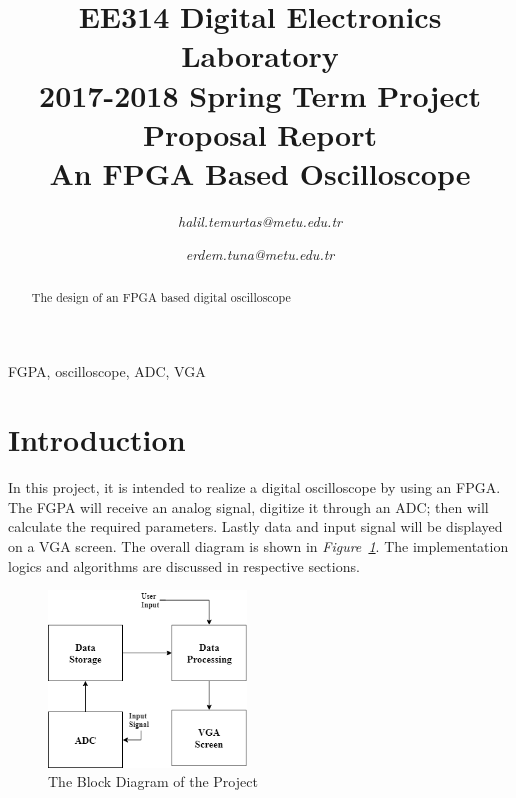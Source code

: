 \documentclass[paper]{IEEEtran}
\begin{document}
\title{EE314 Digital Electronics Laboratory\\
2017-2018 Spring Term Project Proposal Report\\
An FPGA Based Oscilloscope
}


\author{

\textit{halil.temurtas@metu.edu.tr}

\and

\textit{erdem.tuna@metu.edu.tr}


}

\maketitle

\begin{abstract}

The design of an FPGA based digital oscilloscope 

\end{abstract}

\begin{IEEEkeywords}
FGPA, oscilloscope, ADC, VGA
\end{IEEEkeywords}

\section{Introduction}
\- \indent
	In this project, it is intended to realize a digital oscilloscope by using an FPGA. The FGPA will receive an analog signal, digitize it through an ADC; then will calculate the required parameters. Lastly data and input signal will be displayed on a VGA screen. The overall diagram is shown in \textit{Figure~\ref{fig:overall_diagram}}. The implementation logics and algorithms are discussed in respective sections.

\begin{figure}[h!]
	\setlength{\unitlength}{\textwidth}
	\center 
	\includegraphics[width=0.47\textwidth]{overall_diagram}
	\caption{\label{fig:overall_diagram}The Block Diagram of the Project}
\end{figure}
\end{document}
